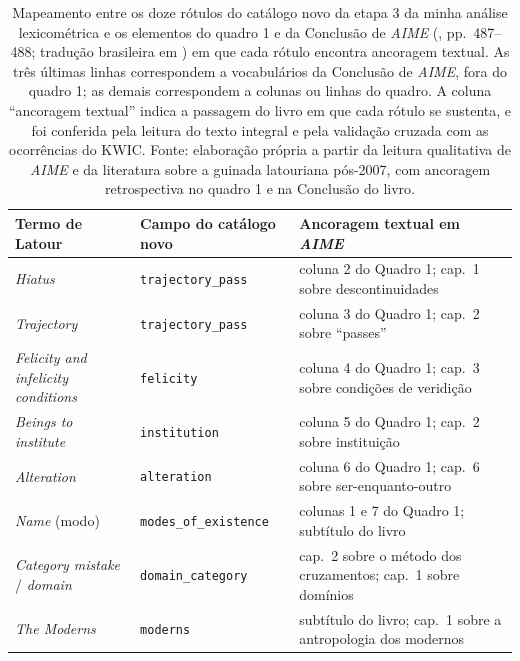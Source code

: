 \begin{table}[!htb]
\centering
\caption[Mapeamento entre o catálogo novo da etapa  3 e o quadro 1 de AIME]{Mapeamento entre os doze rótulos do catálogo novo da etapa  3 da minha análise lexicométrica e os elementos do quadro 1 e da Conclusão de \textit{AIME} (\textcite{Latour2013Inquiry}, pp.~487--488; tradução brasileira em \textcite{Latour2019Investigacao}) em que cada rótulo encontra ancoragem textual. As três últimas linhas correspondem a vocabulários da Conclusão de \textit{AIME}, fora do quadro 1; as demais correspondem a colunas ou linhas do quadro. A coluna \enquote{ancoragem textual} indica a passagem do livro em que cada rótulo se sustenta, e foi conferida pela leitura do texto integral e pela validação cruzada com as ocorrências do KWIC. Fonte: elaboração própria a partir da leitura qualitativa de \textit{AIME} e da literatura sobre a guinada latouriana pós-2007, com ancoragem retrospectiva no quadro 1 e na Conclusão do livro.}
\label{tab:mapeamento_quadro1_catalogo_novo}
\small
\begin{tabular}{p{3.8cm}p{3.5cm}p{6.3cm}}
\toprule
Termo de Latour & Campo do catálogo novo & Ancoragem textual em \textit{AIME} \\
\midrule
\emph{Hiatus}                                  & \texttt{trajectory\_pass}     & coluna 2 do Quadro 1; cap.~1 sobre descontinuidades \\
\emph{Trajectory}                              & \texttt{trajectory\_pass}     & coluna 3 do Quadro 1; cap.~2 sobre \enquote{passes} \\
\emph{Felicity and infelicity conditions}      & \texttt{felicity}             & coluna 4 do Quadro 1; cap.~3 sobre condições de veridição \\
\emph{Beings to institute}                     & \texttt{institution}          & coluna 5 do Quadro 1; cap.~2 sobre instituição \\
\emph{Alteration}                              & \texttt{alteration}           & coluna 6 do Quadro 1; cap.~6 sobre ser-enquanto-outro \\
\emph{Name} (modo)                             & \texttt{modes\_of\_existence} & colunas 1 e 7 do Quadro 1; subtítulo do livro \\
\emph{Category mistake} / \emph{domain}        & \texttt{domain\_category}     & cap.~2 sobre o método dos cruzamentos; cap.~1 sobre domínios \\
\emph{The Moderns}                             & \texttt{moderns}              & subtítulo do livro; cap.~1 sobre a antropologia dos modernos \\

\end{tabular}
\end{table}
